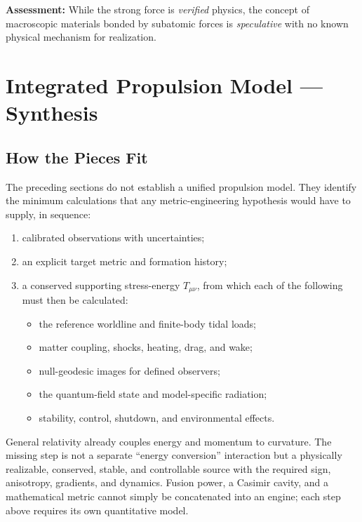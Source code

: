\documentclass[aps,prd,twocolumn,superscriptaddress,nofootinbib,floatfix]{revtex4-2}
\begin{document}
\textbf{Assessment:} While the strong force is \emph{verified} physics, the
concept of macroscopic materials bonded by subatomic forces is \emph{speculative}
with no known physical mechanism for realization.

\section{Integrated Propulsion Model --- Synthesis}\label{sec:synthesis}

\subsection{How the Pieces Fit}\label{sec:pieces}

The preceding sections do not establish a unified propulsion model. They identify
the minimum calculations that any metric-engineering hypothesis would have to
supply, in sequence:
\begin{enumerate}
  \item calibrated observations with uncertainties;
  \item an explicit target metric and formation history;
  \item a conserved supporting stress-energy $T_{\mu\nu}$, from which each of the
        following must then be calculated:
        \begin{itemize}
          \item the reference worldline and finite-body tidal loads;
          \item matter coupling, shocks, heating, drag, and wake;
          \item null-geodesic images for defined observers;
          \item the quantum-field state and model-specific radiation;
          \item stability, control, shutdown, and environmental effects.
        \end{itemize}
\end{enumerate}

General relativity already couples energy and momentum to curvature. The missing
step is not a separate ``energy conversion'' interaction but a physically
realizable, conserved, stable, and controllable source with the required sign,
anisotropy, gradients, and dynamics. Fusion power, a Casimir cavity, and a
mathematical metric cannot simply be concatenated into an engine; each step above
requires its own quantitative model.
\end{document}
